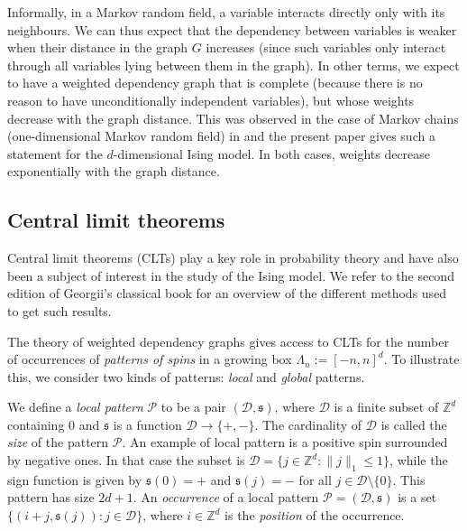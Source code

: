 \documentclass{amsart}
\newcommand{\field}[1]{\mathbb{#1}}
\newcommand{\Z}{\field{Z}}
\numberwithin{equation}{section}
\theoremstyle{remark}
\begin{document}
Informally, in a Markov random field, a variable interacts directly only with its neighbours. 
We can thus expect that the dependency between variables is weaker when their distance in the graph $G$ increases
(since such variables only interact through all variables lying between them in the graph).
In other terms, we expect to have a weighted dependency graph that is complete (because there is no reason to have 
unconditionally independent variables), but whose weights decrease with the graph distance.
This was observed in the case of Markov chains (one-dimensional Markov random field)
in \cite[Section 10]{Valentin} and the present paper gives such a statement for the $d$-dimensional Ising model.
In both cases, weights decrease exponentially with the graph distance.

\subsection{Central limit theorems}
Central limit theorems (CLTs) play a key role in probability theory
and have also been a subject of interest in the study of the Ising model.
We refer to the second edition of Georgii's classical book
\cite[Bibliographic Notes on Section 8.2, p469]{Georgii2011}
for an overview of the different methods used to get such results.

The theory of weighted dependency graphs gives access to CLTs for the 
number of occurrences of {\em patterns of spins} in a growing box
$\Lambda_{n} := [-n,n]^d$.
To illustrate this, we consider two kinds of patterns: {\em local} and {\em global} patterns.

We define a \emph{local pattern} $\mathcal{P}$ to be a pair $(\mathcal{D}, \mathfrak{s})$, where $\mathcal{D}$ is a finite subset of $\Z^d$ containing $0$ and $\mathfrak{s}$ is a function $\mathcal{D} \longrightarrow \{+,-\}.$ The cardinality of $\mathcal{D}$ is called the \emph{size} of the pattern $\mathcal{P}.$
An example of local pattern is a positive spin surrounded by negative ones.
In that case the subset is \hbox{$\mathcal{D} = \{j \in \Z^d: \|j\|_1 \le 1\}$}, while the sign function is given by $\mathfrak{s}(0)=+$ and $\mathfrak{s}(j) = -$ for all $j \in \mathcal{D} \setminus \{0\}$. This pattern has size $2d+1$.
An \emph{occurrence} of a local pattern $\mathcal{P}=(\mathcal{D}, \mathfrak{s})$ is a set $\{(i+j,\mathfrak{s}(j)) : j \in \mathcal{D}\}$, where $i \in \Z^d$ is the \emph{position} of the occurrence. 
\end{document}
